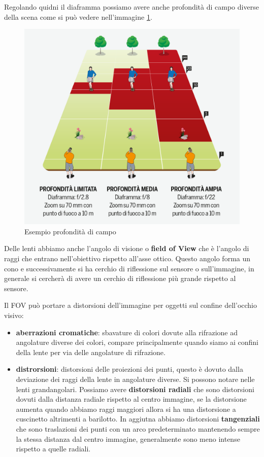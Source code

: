 Regolando quidni il diaframma possiamo avere anche profondità di campo diverse della scena
come si può vedere nell'immagine \ref{fig:prof_campo}.

\begin{figure}
    \centering
    \includegraphics*[]{./figure/profondita-campo.png}
    \caption{Esempio profondità di campo}
    \label{fig:prof_campo}
\end{figure}

Delle lenti abbiamo anche l'angolo di visione o \textbf{field of View} che è l'angolo 
di raggi che entrano nell'obiettivo rispetto all'asse ottico. Questo angolo forma 
un cono e successivamente si ha cerchio di riflessione sul sensore o sull'immagine, in generale
si cercherà di avere un cerchio di riflessione più grande rispetto al sensore.

Il FOV può portare a distorsioni dell'immagine per oggetti sul confine dell'occhio visivo:
\begin{itemize}
    \item \textbf{aberrazioni cromatiche}: sbavature di colori dovute alla rifrazione ad 
    angolature diverse dei colori, compare principalmente quando siamo ai confini
    della lente per via delle angolature di rifrazione.
    \item \textbf{distrorsioni}: distorsioni delle proiezioni dei punti, questo è dovuto 
    dalla deviazione dei raggi della lente in angolature diverse. Si possono notare 
    nelle lenti grandangolari. Possiamo avere \textbf{distorsioni radiali} che sono 
    distorsioni dovuti dalla distanza radiale rispetto al centro immagine, se la distorsione
    aumenta quando abbiamo raggi maggiori allora si ha una distorsione a cuscinetto 
    altrimenti a barilotto. In aggiutna abbiamo distorsioni \textbf{tangenziali}
    che sono traslazioni dei punti con un arco predeterminato mantenendo sempre la 
    stessa distanza dal centro immagine, generalmente sono meno intense rispetto 
    a quelle radiali.
\end{itemize}


